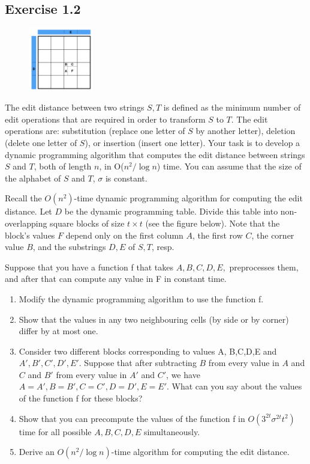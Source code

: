 \documentclass[10pt,a4paper]{article}
\begin{document}
\subsection*{Exercise 1.2}

\begin{figure}
    \includegraphics[width=0.25\textwidth]{table}
\end{figure}
The edit distance between two strings $S,T$ is defined as the minimum number of edit operations that are required in order to transform $S$ to $T$. The edit operations are: substitution (replace one letter of $S$ by another letter), deletion (delete one letter of $S$), or insertion (insert one letter). Your task is to develop a dynamic programming algorithm that computes the edit distance between strings $S$ and $T$, both of length $n$, in O($n^2/\log n$) time. You can assume that the size of the alphabet of $S$ and $T$, $\sigma$ is constant.

Recall the $O(n^2)$-time dynamic programming algorithm for computing the edit distance. Let $D$ be the dynamic programming table. Divide this table into non-overlapping square blocks of size $t \times t$ (see the figure below). Note that the block's values $F$ depend only on the first column $A$, the first row $C$, the corner value $B$, and the substrings $D, E$ of $S,T$, resp.

Suppose that you have a function f that takes $A,B,C,D,E,$ preprocesses them, and after that can compute any value in F in constant time. \begin{enumerate}
\item Modify the dynamic programming algorithm to use the function f.
\item Show that the values in any two neighbouring cells (by side or by corner) differ by at most one.
\item Consider two different blocks corresponding to values A, B,C,D,E and $A',B',C',D',E'$. Suppose that after subtracting $ B$ from every value in $A$ and $C$ and $B'$ from every value in $A'$ and $C'$, we have $A=A',B=B',C=C',D=D',E=E'$. What can you say about the values of the function f for these blocks?
\item Show that you can precompute the values of the function f in $O(3^{2t}\sigma ^{2t}t^2)$ time for all possible $A,B,C,D,E$ simultaneously.
\item Derive an $O(n^2/ \log n)$-time algorithm for computing the edit distance.
\end{enumerate}
\end{document}
